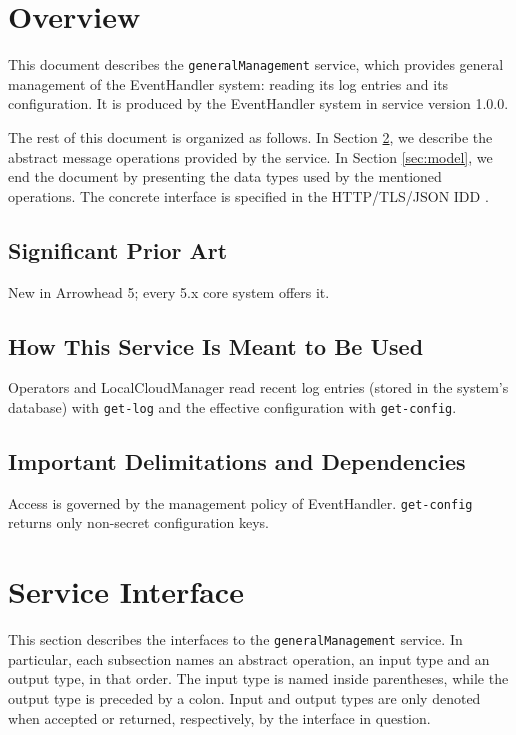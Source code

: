 \documentclass[a4paper]{arrowhead}
\begin{document}
\section{Overview}
\label{sec:overview}

This document describes the \texttt{generalManagement} service, which provides general management of the EventHandler system: reading its log entries and its configuration.
It is produced by the EventHandler system \cite{eh-sysd} in service version 1.0.0.

The rest of this document is organized as follows.
In Section \ref{sec:operations}, we describe the abstract message operations provided by the service.
In Section \ref{sec:model}, we end the document by presenting the data types used by the mentioned operations.
The concrete interface is specified in the HTTP/TLS/JSON IDD \cite{eh-generalManagement-http-idd}.

\subsection{Significant Prior Art}

New in Arrowhead 5; every 5.x core system offers it.

\subsection{How This Service Is Meant to Be Used}

Operators and LocalCloudManager read recent log entries (stored in the system's database) with \texttt{get-\allowbreak{}log} and the effective configuration with \texttt{get-\allowbreak{}config}.

\subsection{Important Delimitations and Dependencies}
\label{sec:delimitations}

Access is governed by the management policy of EventHandler. \texttt{get-\allowbreak{}config} returns only non-secret configuration keys.

\newpage

\section{Service Interface}
\label{sec:operations}

This section describes the interfaces to the \texttt{generalManagement} service.
In particular, each subsection names an abstract operation, an input type and an output type, in that order.
The input type is named inside parentheses, while the output type is preceded by a colon.
Input and output types are only denoted when accepted or returned, respectively, by the interface in question.
\end{document}
